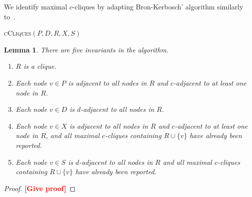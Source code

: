 \documentclass[11pt]{article}
\newcommand{\todo}[1]{\xspace{\bfseries\sffamily\textcolor{red}{[#1]}}\xspace}
\newtheorem{lemma}[theorem]{Lemma}
\begin{document}
We identify maximal $c$-cliques by adapting Bron-Kerbosch' algorithm similarly
to~\cite{Koch:1996fc,Koch:2001wi}.

\begin{algorithm2e}
  \caption{\textsc{cCliques}$(P,D,R,X,S)$}
  \label{alg:bk-pivot}
\end{algorithm2e}

\begin{lemma}
There are five invariants in the algorithm.
\begin{enumerate}
  \item $R$ is a clique.
  \item Each node $v \in P$ is adjacent to all nodes in $R$ and $c$-adjacent to
    at least one node in $R$.
  \item Each node $v \in D$ is $d$-adjacent to all nodes in $R$.
  \item Each node $v \in X$ is adjacent to all nodes in $R$ and $c$-adjacent to
    at least one node in $R$, and all maximal
    $c$-cliques containing $R \cup \{v\}$ have already been reported.
  \item Each node $v \in S$ is $d$-adjacent to all nodes in $R$ and all maximal
    $c$-cliques containing $R \cup \{v\}$ have already been reported.
\end{enumerate}
\end{lemma}
\begin{proof}
\todo{Give proof}
\end{proof}
\end{document}
